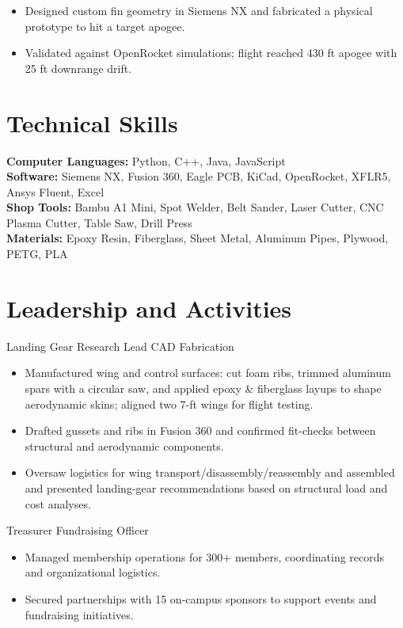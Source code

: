 \begin{itemize}
  \item Designed custom fin geometry in Siemens NX and fabricated a physical prototype to hit a target apogee.
  \item Validated against OpenRocket simulations; flight reached 430 ft apogee with 25 ft downrange drift.
\end{itemize}

\section{Technical Skills}
\textbf{Computer Languages:} Python, C++, Java, JavaScript\\
\textbf{Software:} Siemens NX, Fusion 360, Eagle PCB, KiCad, OpenRocket, XFLR5, Ansys Fluent, Excel\\
\textbf{Shop Tools:} Bambu A1 Mini, Spot Welder, Belt Sander, Laser Cutter, CNC Plasma Cutter, Table Saw, Drill Press\\
\textbf{Materials:} Epoxy Resin, Fiberglass, Sheet Metal, Aluminum Pipes, Plywood, PETG, PLA

\section{Leadership and Activities}

Landing Gear Research Lead \textbar{} CAD \textbar{} Fabrication
\begin{itemize}
  \item Manufactured wing and control surfaces: cut foam ribs, trimmed aluminum spars with a circular saw, and applied epoxy \& fiberglass layups to shape aerodynamic skins; aligned two 7-ft wings for flight testing.
  \item Drafted gussets and ribs in Fusion 360 and confirmed fit-checks between structural and aerodynamic components.
  \item Oversaw logistics for wing transport/disassembly/reassembly and assembled and presented landing-gear recommendations based on structural load and cost analyses.
\end{itemize}
\entrygap

Treasurer \textbar{} Fundraising Officer
\begin{itemize}
  \item Managed membership operations for 300+ members, coordinating records and organizational logistics.
  \item Secured partnerships with 15 on-campus sponsors to support events and fundraising initiatives.
\end{itemize}



